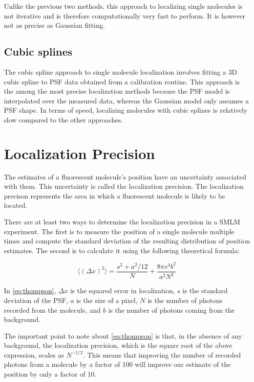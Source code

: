 \documentclass[10pt,a4paper]{book}
\begin{document}
Unlike the previous two methods, this approach to localizing single molecules is not iterative and is therefore computationally very fast to perform. It is however not as precise as Gaussian fitting.

\subsection{Cubic splines}

The cubic spline approach to single molecule localization involves fitting a 3D cubic spline to PSF data obtained from a calibration routine. This approach is the among the most precise localization methods because the PSF model is interpolated over the measured data, whereas the Gaussian model only assumes a PSF shape. In terms of speed, localizing molecules with cubic splines is relatively slow compared to the other approaches.

\section{Localization Precision}

The estimates of a fluorescent molecule's position have an uncertainty associated with them. This uncertainty is called the localization precision. The localization precison represents the area in which a fluorescent molecule is likely to be located.

There are at least two ways to determine the localization precision in a SMLM experiment. The first is to measure the position of a single molecule multiple times and compute the standard deviation of the resulting distribution of position estimates. The second is to calculate it using the following theoretical formula:

\begin{equation}
    \langle \left( \Delta x \right)^2 \rangle = \frac{s^2 + a^{2}/12}{N} + \frac{8 \pi s^4 b^2}{a^2 N^2}
    \label{eq:thompson}
\end{equation}

\noindent In \autoref{eq:thompson}, $\Delta x$ is the squared error in localization, $s$ is the standard deviation of the PSF, $a$ is the size of a pixel, $N$ is the number of photons recorded from the molecule, and $b$ is the number of photons coming from the background. 

The important point to note about \autoref{eq:thompson} is that, in the absence of any background, the localization precision, which is the square root of the above expression, scales as $N^{-1/2}$. This means that improving the number of recorded photons from a molecule by a factor of 100 will improve our estimate of the position by only a factor of 10.
\end{document}
